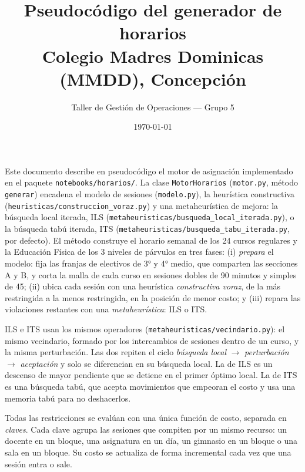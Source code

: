 \documentclass{article}
\title{Pseudocódigo del generador de horarios\\[2pt]
       \large Colegio Madres Dominicas (MMDD), Concepción}
\author{Taller de Gestión de Operaciones --- Grupo 5}
\date{\today}
\begin{document}
\maketitle
\sloppy %

Este documento describe en pseudocódigo el motor de asignación implementado en
el paquete \texttt{notebooks/horarios/}. La clase \texttt{MotorHorarios} (\texttt{motor.py},
método \texttt{generar}) encadena el modelo de sesiones (\texttt{modelo.py}), la heurística
constructiva (\texttt{heuristicas/construccion\_voraz.py}) y una metaheurística de mejora:
la búsqueda local iterada, ILS (\texttt{metaheuristicas/busqueda\_local\_iterada.py}), o la
búsqueda tabú iterada, ITS (\texttt{metaheuristicas/busqueda\_tabu\_iterada.py}, por defecto).
El método construye el horario semanal de los 24 cursos regulares y la Educación Física de
los 3 niveles de párvulos en tres fases:
(i) \emph{prepara} el modelo: fija las franjas de electivos de 3° y 4° medio, que
comparten las secciones A y B, y corta la malla de cada curso en sesiones dobles
de 90 minutos y simples de 45;
(ii) ubica cada sesión con una heurística \emph{constructiva voraz}, de la más
restringida a la menos restringida, en la posición de menor costo; y
(iii) repara las violaciones restantes con una \emph{metaheurística}: ILS o ITS.

ILS e ITS usan los mismos operadores (\texttt{metaheuristicas/vecindario.py}): el mismo
vecindario, formado por los intercambios de sesiones dentro de un curso, y la misma
perturbación. Las dos repiten el ciclo \emph{búsqueda local} $\to$ \emph{perturbación} $\to$
\emph{aceptación} y solo se diferencian en su búsqueda local. La de ILS es un descenso de
mayor pendiente que se detiene en el primer óptimo local. La de ITS es una búsqueda tabú,
que acepta movimientos que empeoran el costo y usa una memoria tabú para no deshacerlos.

Todas las restricciones se evalúan con una única función de costo, separada en
\emph{claves}. Cada clave agrupa las sesiones que compiten por un mismo recurso:
un docente en un bloque, una asignatura en un día, un gimnasio en un bloque o una
sala en un bloque. Su costo se actualiza de forma incremental cada vez que una
sesión entra o sale.
\end{document}
